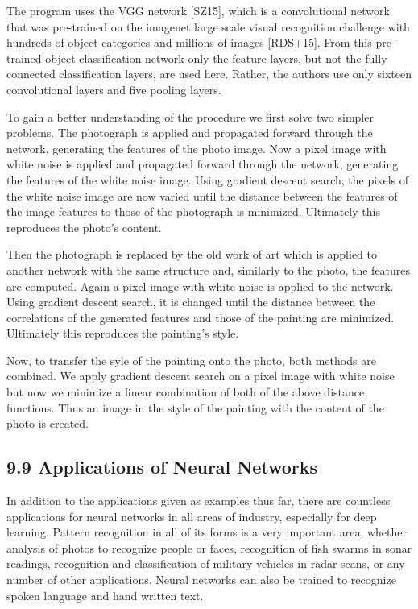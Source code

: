 \documentclass[10pt]{article}
\begin{document}
The program uses the VGG network [SZ15], which is a convolutional network that was pre-trained on the imagenet large scale visual recognition challenge with hundreds of object categories and millions of images [RDS+15]. From this pre-trained object classification network only the feature layers, but not the fully connected classification layers, are used here. Rather, the authors use only sixteen convolutional layers and five pooling layers.

To gain a better understanding of the procedure we first solve two simpler problems. The photograph is applied and propagated forward through the network, generating the features of the photo image. Now a pixel image with white noise is applied and propagated forward through the network, generating the features of the white noise image. Using gradient descent search, the pixels of the white noise image are now varied until the distance between the features of the image features to those of the photograph is minimized. Ultimately this reproduces the photo's content.

Then the photograph is replaced by the old work of art which is applied to another network with the same structure and, similarly to the photo, the features are computed. Again a pixel image with white noise is applied to the network. Using gradient descent search, it is changed until the distance between the correlations of the generated features and those of the painting are minimized. Ultimately this reproduces the painting's style.

Now, to transfer the syle of the painting onto the photo, both methods are combined. We apply gradient descent search on a pixel image with white noise but now we minimize a linear combination of both of the above distance functions. Thus an image in the style of the painting with the content of the photo is created.

\subsection*{9.9 Applications of Neural Networks}
In addition to the applications given as examples thus far, there are countless applications for neural networks in all areas of industry, especially for deep learning. Pattern recognition in all of its forms is a very important area, whether analysis of photos to recognize people or faces, recognition of fish swarms in sonar readings, recognition and classification of military vehicles in radar scans, or any number of other applications. Neural networks can also be trained to recognize spoken language and hand written text.
\end{document}
